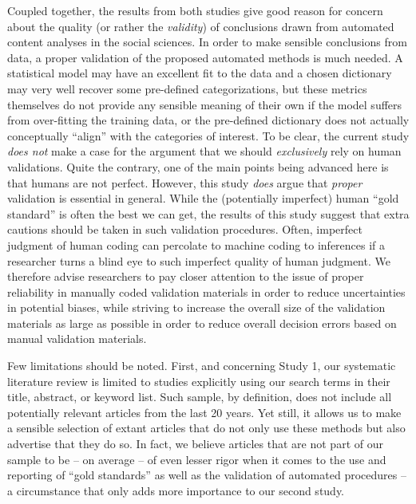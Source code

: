 \documentclass[man, 12pt, a4paper, nolmodern, noextraspace]{apa6}
\begin{document}
    Coupled together, the results from both studies give good reason for concern about the quality (or rather the \textit{validity}) of conclusions drawn from automated content analyses in the social sciences. In order to make sensible conclusions from data, a proper validation of the proposed automated methods is much needed. A statistical model may have an excellent fit to the data and a chosen dictionary may very well recover some pre-defined categorizations, but these metrics themselves do not provide any sensible meaning of their own if the model suffers from over-fitting the training data, or the pre-defined dictionary does not actually conceptually \enquote{align} with the categories of interest. To be clear, the current study \textit{does not} make a case for the argument that we should \textit{exclusively} rely on human validations. Quite the contrary, one of the main points being advanced here is that humans are not perfect. However, this study \textit{does} argue that \textit{proper} validation is essential in general. While the (potentially imperfect) human \enquote{gold standard} is often the best we can get, the results of this study suggest that extra cautions should be taken in such validation procedures. Often, imperfect judgment of human coding can percolate to machine coding to inferences if a researcher turns a blind eye to such imperfect quality of human judgment. We therefore advise researchers to pay closer attention to the issue of proper reliability in manually coded validation materials in order to reduce uncertainties in potential biases, while striving to increase the overall size of the validation materials as large as possible in order to reduce overall decision errors based on manual validation materials.    

    Few limitations should be noted. First, and concerning Study 1, our systematic literature review is limited to studies explicitly using our search terms in their title, abstract, or keyword list. Such sample, by definition, does not include all potentially relevant articles from the last 20 years. Yet still, it allows us to make a sensible selection of extant articles that do not only use these methods but also advertise that they do so. In fact, we believe articles that are not part of our sample to be – on average – of even lesser rigor when it comes to the use and reporting of \enquote{gold standards} as well as the validation of automated procedures -- a circumstance that only adds more importance to our second study.
    
\end{document}
